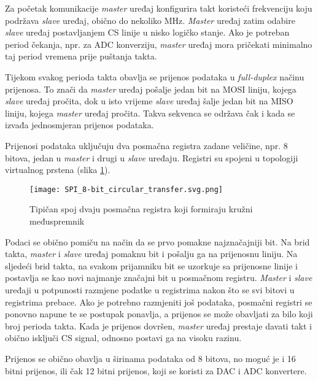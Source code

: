 Za početak komunikacije \textit{master} uređaj konfigurira takt koristeći frekvenciju koju podržava \textit{slave} uređaj, obično do nekoliko \si{MHz}. \textit{Master} uređaj zatim odabire \textit{slave} uređaj postavljanjem CS linije u nisko logičko stanje. Ako je potreban period čekanja, npr. za ADC konverziju, \textit{master} uređaj mora pričekati minimalno taj period vremena prije puštanja takta.

Tijekom svakog perioda takta obavlja se prijenos podataka u \textit{full-duplex} načinu prijenosa. To znači da \textit{master} uređaj pošalje jedan bit na MOSI liniju, kojega \textit{slave} uređaj pročita, dok u isto vrijeme \textit{slave} uređaj šalje jedan bit na MISO liniju, kojega \textit{master} uređaj pročita. Takva sekvenca se održava čak i kada se izvađa jednosmjeran prijenos podataka.

Prijenosi podataka uključuju dva posmačna registra zadane veličine, npr. 8 bitova, jedan u \textit{master} i drugi u \textit{slave} uređaju. Registri su spojeni u topologiji virtualnog prstena (slika \ref{fig:spi_circular_transfer}).
\begin{figure}[H]
	\centering
	\texttt{[image: SPI\_8-bit\_circular\_transfer.svg.png]}
	\caption{Tipičan spoj dvaju posmačna registra koji formiraju kružni međuspremnik \cite{spi_wikipedia}}
	\label{fig:spi_circular_transfer}
\end{figure}
Podaci se obično pomiču na način da se prvo pomakne najznačajniji bit. Na brid takta, \textit{master} i \textit{slave} uređaj pomaknu bit i pošalju ga na prijenosnu liniju. Na sljedeći brid takta, na svakom prijamniku bit se uzorkuje sa prijenosne linije i postavlja se kao novi najmanje značajni bit u posmačnom registru. \textit{Master} i \textit{slave} uređaji u potpunosti razmjene podatke u registrima nakon što se svi bitovi u registrima prebace. Ako je potrebno razmjeniti još podataka, posmačni registri se ponovno napune te se postupak ponavlja, a prijenos se može obavljati za bilo koji broj perioda takta. Kada je prijenos dovršen, \textit{master} uređaj prestaje davati takt i obično isključi CS signal, odnosno postavi ga na visoku razinu.

Prijenos se obično obavlja u širinama podataka od 8 bitova, no moguć je i 16 bitni prijenos, ili čak 12 bitni prijenos, koji se koristi za DAC i ADC konvertere.